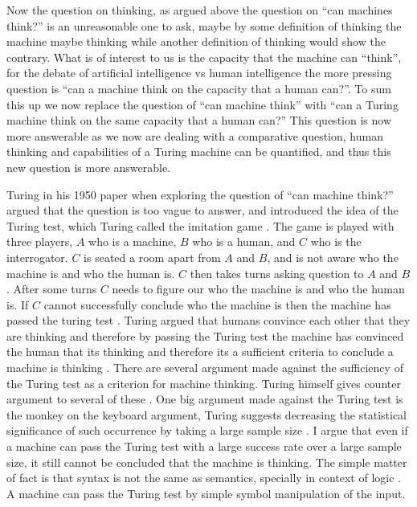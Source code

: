 \documentclass[11pt,a4paper]{article}
\begin{document}
Now the question on thinking, as argued above the question on ``can machines think?'' is an unreasonable one to ask, maybe by some definition of thinking the machine maybe thinking while another definition of thinking would show the contrary. 
What is of interest to us is the capacity that the machine can ``think'', for the debate of artificial intelligence vs human intelligence the more pressing question is ``can a machine think on the capacity that a human can?''.
To sum this up we now replace the question of ``can machine think'' with ``can a Turing machine think on the same capacity that a human can?''
This question is now more answerable as we now are dealing with a comparative question, human thinking and capabilities of a Turing machine can be quantified, and thus this new question is more answerable.
\\\par
Turing in his 1950 paper when exploring the question of ``can machine think?'' argued that the question is too vague to answer, and introduced the idea of the Turing test, which Turing called the imitation game \cite{Turing50}.
The game is played with three players, $A$ who is a machine, $B$ who is a human, and $C$ who is the interrogator. $C$ is seated a room apart from $A$ and $B$, and is not aware who the machine is and who the human is. 
$C$ then takes turns asking question to $A$ and $B$. After some turns $C$ needs to figure our who the machine is and who the human is. If $C$ cannot successfully conclude who the machine is then the machine has passed the turing test \cite{Turing50}.
Turing argued that humans convince each other that they are thinking and therefore by passing the Turing test the machine has convinced the human that its thinking and therefore its a sufficient criteria to conclude a machine is thinking \cite{Turing50}.
There are several argument made against the sufficiency of the Turing test as a criterion for machine thinking. Turing himself gives counter argument to several of these \cite{Turing50}. 
One big argument made against the Turing test is the monkey on the keyboard argument, Turing suggests decreasing the statistical significance of such occurrence by taking a large sample size \cite{Turing50}.
I argue that even if a machine can pass the Turing test with a large success rate over a large sample size, it still cannot be concluded that the machine is thinking.
The simple matter of fact is that syntax is not the same as semantics, specially in context of logic \cite{Anita}. A machine can pass the Turing test by simple symbol manipulation of the input.
\end{document}
